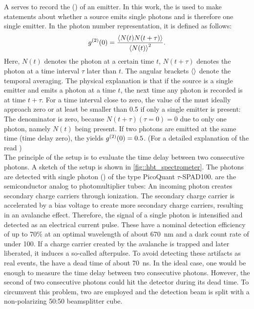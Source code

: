 		A  serves to record the  () of an emitter.
		In this work, the \gtf is used to make statements about whether a \pl source emits single photons and is therefore one single emitter.
		In the photon number representation, it is defined as follows:
		\[
		g^{(2)}(0) = \frac{ \left\langle  N(t) N(t+\tau) \right\rangle }{\left\langle N(t)\right\rangle^2}.
		\]
		Here, $N(t)$ denotes the photon at a certain time $t$, $N(t+\tau)$ denotes the photon at a time interval $\tau$ later than $t$.
		The angular brackets $\left\langle \right\rangle$ denote the temporal averaging.
		The physical explanation is  that if the source is a single emitter and emits a photon at a  time $t$, the next time any photon is recorded is at time $t+\tau$.
		For a time interval close to zero, the value of the \gtf must ideally approach zero or at least be smaller than \num{0.5} if only a single emitter is present:
		The denominator is zero, because $N(t + \tau) (\tau = 0)=0$ due to only one photon, namely $N(t)$ being present.
		If two photons are emitted at the same time (time delay zero), the \gtf yields $g^{(2)}(0)=0.5$.
		(For a detailed explanation of the \gtf read \cite{Fox2006})
		\\
		The principle of the \hbt setup is to evaluate the time delay between two consecutive photons.
		A sketch of the \hbt setup is shown in \autoref{fig::hbt_spectrometer}.
		The photons are detected with single photon \apds (\APDs) of the type PicoQuant $\tau${}-SPAD100.
		\APDs are the semiconductor analog to photomultiplier tubes:
		An incoming photon creates secondary charge carriers through ionization.
		The secondary charge carrier is accelerated by a bias voltage to create more secondary charge carriers, resulting in an avalanche effect.
		Therefore, the signal of a single photon is intensified and detected as an electrical current pulse.
		These \apds have a nominal detection efficiency of up to 70\% at an optimal wavelength of about \SI{670}{\nm} and a dark count rate of under \SI{100}{\cps}.
		If a charge carrier created by the avalanche is trapped and later liberated, it induces a so-called afterpulse.
		To avoid detecting these artifacts as real events, the \APDs have a dead time of about \SI{70}{\ns}.
		In the ideal case, one \APD would be enough to measure the time delay between two consecutive photons.
		However, the second of two consecutive photons could hit the detector during its dead time.
		To circumvent this problem, two \APDs are employed and the detection beam is split with a non-polarizing 50:50 beamsplitter cube.
